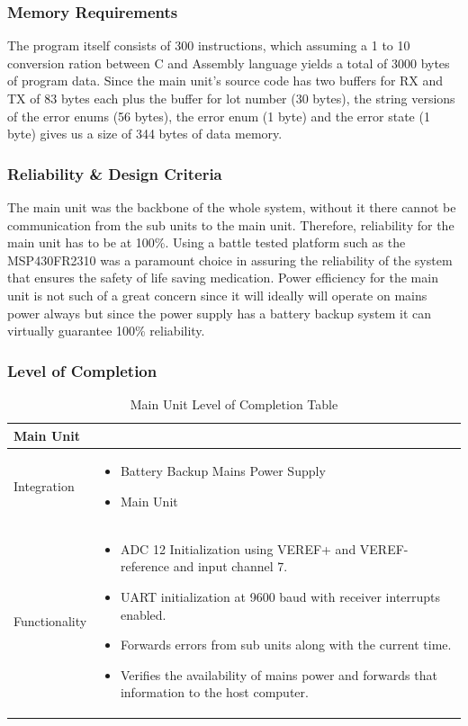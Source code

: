 \subsubsection{Memory Requirements}
The program itself consists of 300 instructions, which assuming a 1 to 10 conversion ration between C and Assembly language yields a total of 3000 bytes of program data. Since the main unit's source code has two buffers for RX and TX of 83 bytes each plus the buffer for lot number (30 bytes), the string versions of the error enums (56 bytes), the error enum (1 byte) and the error state (1 byte) gives us a size of 344 bytes of data memory.
\subsubsection{Reliability \& Design Criteria}
The main unit was the backbone of the whole system, without it there cannot be communication from the sub units to the main unit. Therefore, reliability for the main unit has to be at 100\%. Using a battle tested platform such as the MSP430FR2310 was a paramount choice in assuring the reliability of the system that ensures the safety of life saving medication. Power efficiency for the main unit is not such of a great concern since it will ideally will operate on mains power always but since the power supply has a battery backup system it can virtually guarantee 100\% reliability.
\subsubsection{Level of Completion}
\begin{landscape}
  \begin{table}[!ht]
    \begin{tabularx}{\textwidth}{|X|X|}
      \hline
      \multicolumn{2}{|X|}{Main Unit}\\
      \hline
      Integration&\begin{itemize}
                    \item Battery Backup Mains Power Supply
                    \item Main Unit
                  \end{itemize}\\
                  \hline
      Functionality&\begin{itemize}
          \item ADC 12 Initialization using VEREF+ and VEREF- reference and input channel 7.
          \item UART initialization at 9600 baud with receiver interrupts enabled.
          \item Forwards errors from sub units along with the current time.
          \item Verifies the availability of mains power and forwards that information to the host computer.
        \end{itemize}\\
      \hline
    \end{tabularx}
    \caption{Main Unit Level of Completion Table}
    \label{tab:main-unit-modular-completion-table}
  \end{table}
\end{landscape}
